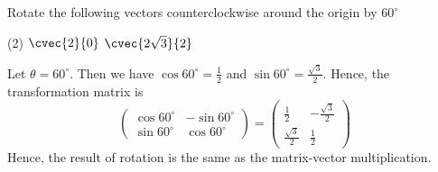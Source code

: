  
\begin{frame}[t] 
\begin{ex} 
Rotate the following vectors counterclockwise around the origin by $60^{\circ}$
\begin{tasks}(2)
\task $\cvec{2}{0}$ 
\task $\cvec{2\sqrt{3}}{2}$
\end{tasks}
\end{ex} 
\begin{sol}
Let $\theta = 60^{\circ}$. Then we have $\cos 60^{\circ} = \frac{1}{2}$ and $\sin 60^{\circ} = \frac{\sqrt{3}}{2}$. Hence, the transformation matrix is
\[\begin{pmatrix} \cos 60^{\circ}& -\sin 60^{\circ} \\ \sin 60^{\circ} & \cos 60^{\circ} \end{pmatrix} = \begin{pmatrix} \frac{1}{2} & -\frac{\sqrt{3}}{2} \\ \frac{\sqrt{3}}{2}& \frac{1}{2} \end{pmatrix}\]
Hence, the result of rotation is the same as the matrix-vector multiplication.
\end{sol}
\end{frame}


